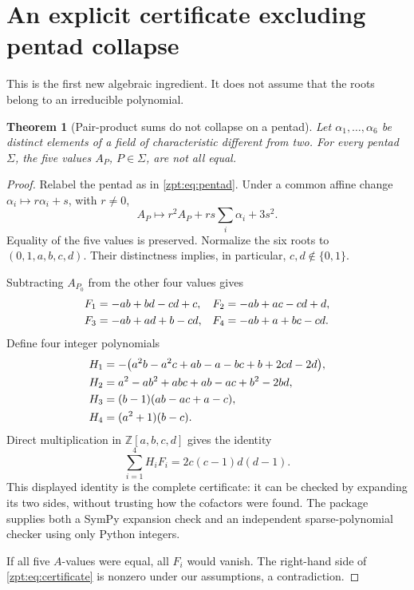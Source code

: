 \documentclass[11pt,letterpaper]{article}
\numberwithin{equation}{section}
\newtheorem{theorem}{Theorem}[section]
\theoremstyle{definition}
\theoremstyle{remark}
\newcommand{\ZZ}{\mathbb Z}
\begin{document}
\section{An explicit certificate excluding pentad collapse}
\label{zpt:sec:certificate}
This is the first new algebraic ingredient. It does not assume that the
roots belong to an irreducible polynomial.

\begin{theorem}[Pair-product sums do not collapse on a pentad]
\label{zpt:thm:noncollapse}
Let $\alpha_1,\ldots,\alpha_6$ be distinct elements of a field of
characteristic different from two. For every pentad $\Sigma$, the five
values $A_P$, $P\in\Sigma$, are not all equal.
\end{theorem}
\begin{proof}
Relabel the pentad as in \eqref{zpt:eq:pentad}. Under a common affine change
$\alpha_i\mapsto r\alpha_i+s$, with $r\ne0$,
\[
 A_P\mapsto r^2 A_P+rs\sum_i\alpha_i+3s^2.
\]
Equality of the five values is preserved. Normalize the six roots to
$(0,1,a,b,c,d)$. Their distinctness implies, in particular,
$c,d\notin\{0,1\}$.

Subtracting $A_{P_0}$ from the other four values gives
\begin{align}
 F_1&=-ab+bd-cd+c,&F_2&=-ab+ac-cd+d,\notag\\
 F_3&=-ab+ad+b-cd,&F_4&=-ab+a+bc-cd.\label{zpt:eq:F}
\end{align}
Define four integer polynomials
\begin{align}
 H_1&=-\bigl(a^2b-a^2c+ab-a-bc+b+2cd-2d\bigr),\notag\\
 H_2&=a^2-ab^2+abc+ab-ac+b^2-2bd,\notag\\
 H_3&=(b-1)(ab-ac+a-c),\notag\\
 H_4&=(a^2+1)(b-c).\label{zpt:eq:H}
\end{align}
Direct multiplication in $\ZZ[a,b,c,d]$ gives the identity
\begin{equation}
 \boxed{\quad\sum_{i=1}^4 H_iF_i=2c(c-1)d(d-1).\quad}
 \label{zpt:eq:certificate}
\end{equation}
This displayed identity is the complete certificate: it can be checked by
expanding its two sides, without trusting how the cofactors were found.
The package supplies both a SymPy expansion check and an independent
sparse-polynomial checker using only Python integers.

If all five $A$-values were equal, all $F_i$ would vanish. The right-hand
side of \eqref{zpt:eq:certificate} is nonzero under our assumptions, a
contradiction.
\end{proof}
\end{document}
